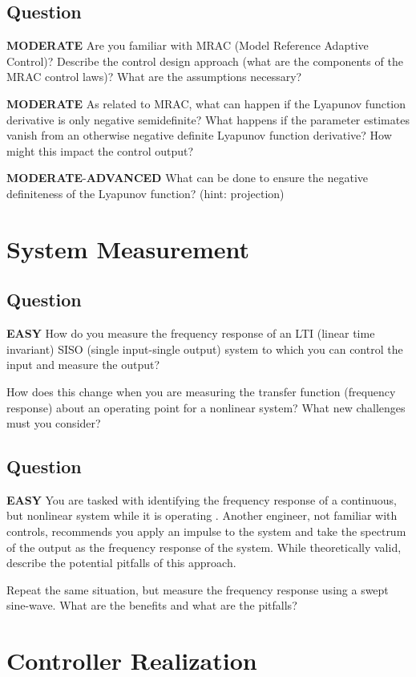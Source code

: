 \documentclass{article}
\newcommand{\RatingBase}[2]{\textcolor{#1}{{\fontfamily{phv}\selectfont\textbf{#2}}}}
\newcommand{\Easy}{\RatingBase{green!50!black!50}{EASY}}
\newcommand{\Moderate}{\RatingBase{yellow!50!black!50}{MODERATE}}
\newcommand{\Advanced}{\RatingBase{red!50!black!50}{ADVANCED}}
\begin{document}
\subsection{Question} \Moderate{}
Are you familiar with MRAC (Model Reference Adaptive Control)?  Describe the control design approach (what are the components of the MRAC control laws)?  What are the assumptions necessary?

\Moderate{} As related to MRAC, what can happen if the Lyapunov function derivative is only negative semidefinite?  What happens if the parameter estimates vanish from an otherwise negative definite Lyapunov function derivative?  How might this impact the control output?  

\Moderate{}-\Advanced{} What can be done to ensure the negative definiteness of the Lyapunov function?  (hint: projection)

\section{System Measurement}
\subsection{Question}
\Easy{} How do you measure the frequency response of an LTI (linear time invariant) SISO (single input-single output) system to which you can control the input and measure the output?

How does this change when you are measuring the transfer function (frequency response) about an operating point for a nonlinear system?  What new challenges must you consider?

\subsection{Question}
\Easy{} You are tasked with identifying the frequency response of a continuous, but nonlinear system while it is operating .  Another engineer, not familiar with controls, recommends you apply an impulse to the system and take the spectrum of the output as the frequency response of the system.  While theoretically valid, describe the potential pitfalls of this approach.

Repeat the same situation, but measure the frequency response using a swept sine-wave.  What are the benefits and what are the pitfalls?

\section{Controller Realization}
\end{document}
